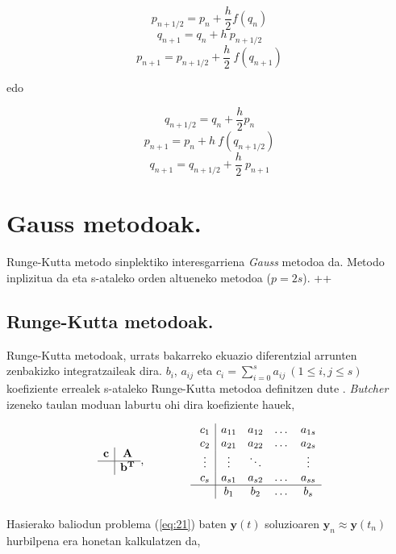 \[p_{{n+1}/{2}}=p_n+\frac{h}{2} f(q_n)\]
\begin{equation}
q_{n+1}=q_n+h \ p_{{n+1}/{2}}
\end{equation}
\[p_{n+1}=p_{{n+1}/{2}}+\frac{h}{2} \ f(q_{n+1})\]

edo

\[q_{{n+1}/{2}}=q_n+\frac{h}{2} p_n\]
\begin{equation}
p_{n+1}=p_n+h \ f(q_{{n+1}/{2}})
\end{equation}
\[q_{n+1}=q_{{n+1}/{2}}+\frac{h}{2} \ p_{n+1}\]


\section{Gauss metodoak.}

Runge-Kutta  metodo sinplektiko interesgarriena \emph{Gauss} metodoa da. Metodo inplizitua da eta s-ataleko orden altueneko metodoa ($p=2s$). ++

\subsection{Runge-Kutta metodoak.}

Runge-Kutta metodoak, urrats bakarreko ekuazio diferentzial arrunten zenbakizko integratzaileak dira.  $b_{i}$, $a_{ij}$ eta $c_i=\sum\limits_{i=0}^{s} a_{ij} \ (1 \leq i,j \leq s)$ koefiziente errealek s-ataleko Runge-Kutta metodoa definitzen dute . \emph{Butcher} izeneko taulan moduan laburtu ohi dira koefiziente hauek, 

\begin{equation}
\begin{array}{c|c}
  \bf{c} & \bf{A} \\
  \hline
         &  \bf{b}^T\\
\end{array}, \ \ \ \ \ \ \ \ \ \ \ \
\begin{array}{c|cccc}
  \ c_1 &  a_{11} & a_{12} & \dots & a_{1s}\\
  \ c_2 &  a_{21} & a_{22} & \dots &a_{2s}\\
  \ \vdots & \vdots & \ddots & & \vdots \\
  \ c_s & a_{s1} & a_{s2} & \dots & a_{ss}\\
  \hline
  \  & b_{1} & b_{2} & \dots & b_{s}\\
\end{array}
\end{equation}

\paragraph*{} Hasierako baliodun problema (\ref{eq:21}) baten $\mathbf{y}(t)$ soluzioaren $\mathbf{y}_n \approx \mathbf{y}(t_n)$ hurbilpena era honetan kalkulatzen da,


